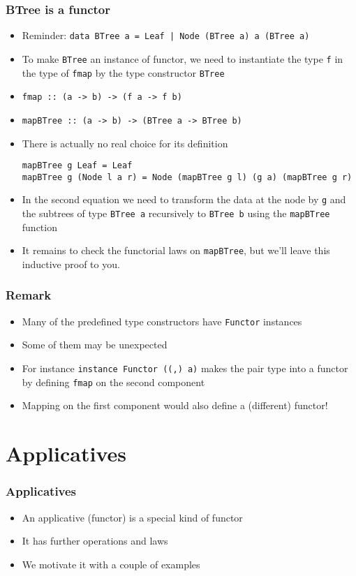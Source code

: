 \documentclass{beamer}
\begin{document}
\begin{frame}[fragile]
  \frametitle{BTree is a functor}
  \begin{itemize}[<+->]
  \item Reminder:
    \lstinline$data BTree a = Leaf | Node (BTree a) a (BTree a)$
  \item To make \lstinline$BTree$ an instance of functor, we need to instantiate
    the type \lstinline$f$ in the type of \lstinline|fmap| by the type constructor
    \lstinline|BTree|
  \item \lstinline|fmap :: (a -> b) -> (f a -> f b)|
  \item \lstinline|mapBTree :: (a -> b) -> (BTree a -> BTree b)|
  \item There is actually no real choice for its definition
\begin{lstlisting}
mapBTree g Leaf = Leaf
mapBTree g (Node l a r) = Node (mapBTree g l) (g a) (mapBTree g r)
\end{lstlisting}
  \item In the second equation we need to transform the data at the
    node by \lstinline$g$ and the subtrees of type
    \lstinline$BTree a$ recursively to \lstinline$BTree b$ using the
    \lstinline$mapBTree$ function
  \item It remains to check the functorial laws on
    \lstinline|mapBTree|, but we'll leave this inductive proof to you.
  \end{itemize}
\end{frame}
\begin{frame}
  \frametitle{Remark}
  \begin{itemize}
  \item Many of the predefined type constructors have \texttt{Functor}
    instances
  \item Some of them may be unexpected
  \item For instance \lstinline|instance Functor ((,) a)| makes the pair
    type into a functor by defining \texttt{fmap} on the second
    component
  \item Mapping on the first component would also define a (different) functor!
  \end{itemize}
\end{frame}
\section{Applicatives}
\begin{frame}
  \frametitle{Applicatives}
  \begin{itemize}
  \item An applicative (functor) is a special kind of functor
  \item It has further operations and laws
  \item We motivate it with a couple of examples
  \end{itemize}
\end{frame}
\end{document}
